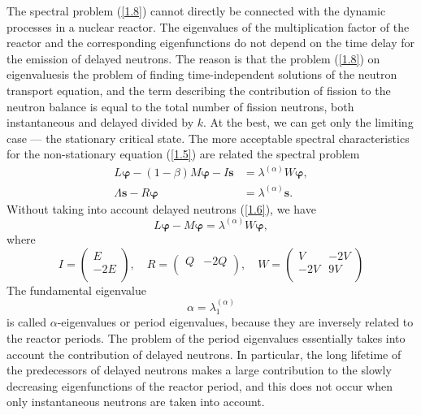 \documentclass[authoryear]{elsarticle}
\begin{document}
The spectral problem (\ref{1.8}) cannot directly be connected with the
dynamic processes in a nuclear reactor. 
The eigenvalues of the multiplication factor of the reactor and the corresponding eigenfunctions do not depend on the time delay for the emission of delayed neutrons. 
The reason is that the problem (\ref{1.8}) on eigenvalues ​​is the problem of finding time-independent solutions of the neutron transport equation, and the term describing the contribution of fission to the neutron balance is equal to the total number of fission neutrons, both instantaneous and delayed divided by $k$.
At the best, we can get only the limiting case --- the stationary critical state.
The more acceptable spectral characteristics for the non-stationary equation (\ref{1.5}) are related the spectral problem
\begin{equation}\label{1.9}
\begin{split}
L \bm \varphi - (1 - \beta) M \bm \varphi - I \bm s &= \lambda^{(\alpha)} W \bm \varphi, \\
\Lambda \bm s - R \bm \varphi  &= \lambda^{(\alpha)} \bm s.
\end{split}
\end{equation}
Without taking into account delayed neutrons (\ref{1.6}), we have
\begin{equation}\label{1.10}
L \bm \varphi - M \bm \varphi = \lambda^{(\alpha)} W \bm \varphi,
\end{equation}
where
\[
I = \begin{pmatrix}
E \\
-2E \\
\end{pmatrix},
\quad
R = \begin{pmatrix}
Q & -2Q \\
\end{pmatrix},
\quad
W = \begin{pmatrix}
V & -2V \\
-2V & 9V \\
\end{pmatrix}
\]
The fundamental eigenvalue
\[ 
 \alpha = \lambda^{(\alpha)}_1
\]
is called \citep{bell1970} $\alpha$-eigenvalues or period eigenvalues, because they are inversely related to the reactor periods.
The problem of the period eigenvalues essentially takes into account the contribution of delayed neutrons.
In particular, the long lifetime of the predecessors of delayed neutrons makes a large contribution to the slowly decreasing eigenfunctions of the reactor period, and this does not occur when only instantaneous neutrons are taken into account.
\end{document}
